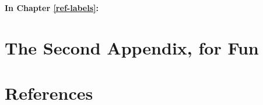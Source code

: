 \documentclass[11pt,twoside]{bristolthesis}
\begin{document}
\textbf{In Chapter \ref{ref-labels}:}

\hypertarget{the-second-appendix-for-fun}{%
\chapter{The Second Appendix, for Fun}\label{the-second-appendix-for-fun}}

\backmatter

\hypertarget{references}{%
\chapter*{References}\label{references}}


\noindent

\setlength{\parindent}{-0.20in}
\setlength{\leftskip}{0.20in}
\setlength{\parskip}{8pt}
\end{document}
